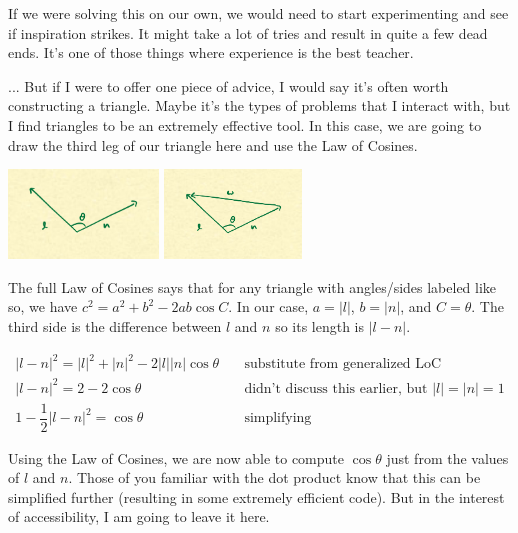 \documentclass{article}
\begin{document}
If we were solving this on our own, we would need to start experimenting and see if inspiration strikes.
It might take a lot of tries and result in quite a few dead ends.
It's one of those things where experience is the best teacher.

... But if I were to offer one piece of advice, I would say it's often worth constructing a triangle.
Maybe it's the types of problems that I interact with, but I find triangles to be an extremely effective tool.
In this case, we are going to draw the third leg of our triangle here and use the Law of Cosines.

\begin{center}
	\includegraphics[width=0.3\textwidth,frame]{assets/ln.jpg}
	\hspace{0.2\textwidth}
	\includegraphics[width=0.2735\textwidth,frame]{assets/lnw.jpg}
\end{center}

The full Law of Cosines says that for any triangle with angles/sides labeled like so, we have $c^2 = a^2 + b^2 - 2ab \cos C$.
In our case, $a = |l|$, $b = |n|$, and $C = \theta$.
The third side is the difference between $l$ and $n$ so its length is $| l - n |$.

\begin{align*}
|l-n|^2 = |l|^2 + |n|^2 - 2 |l| |n| \cos \theta & \quad \text{substitute from generalized LoC} \\
|l-n|^2 = 2 - 2 \cos \theta & \quad \text{didn't discuss this earlier, but } |l| = |n| = 1 \\
1 - \dfrac{1}{2}|l-n|^2 = \cos \theta & \quad \text{simplifying}
\end{align*}

Using the Law of Cosines, we are now able to compute $\cos \theta$ just from the values of $l$ and $n$.
Those of you familiar with the dot product know that this can be simplified further (resulting in some extremely efficient code).
But in the interest of accessibility, I am going to leave it here.
\end{document}
